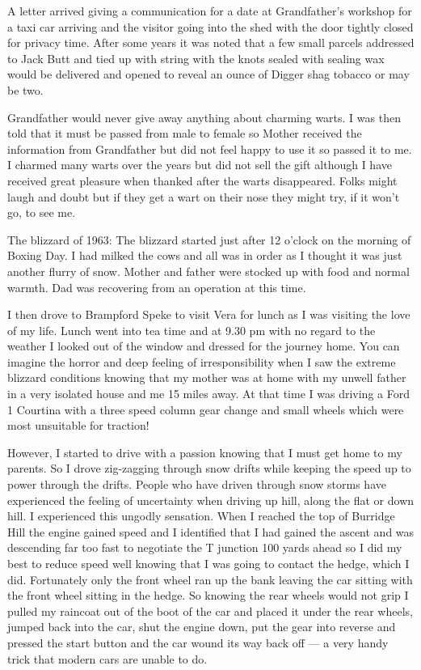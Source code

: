 A letter arrived giving a communication for a date at Grandfather's workshop for
a taxi car arriving and the visitor going into the shed with the door tightly
closed for privacy time. After some years it was noted that a few small
parcels addressed to Jack Butt and tied up with string with the knots sealed
with sealing wax would be delivered and opened to reveal an ounce of Digger
shag tobacco or may be two.

Grandfather would never give away anything about charming warts. I was then
told that it must be passed from male to female so Mother received the
information from Grandfather but did not feel happy to use it so passed it to
me. I charmed many warts over the years but did not sell the gift although I
have received great pleasure when thanked after the warts disappeared. Folks
might laugh and doubt but if they get a wart on their nose they might try, if
it won't go, to see me.









The blizzard of 1963: The blizzard started just after 12 o'clock on the morning
of Boxing Day. I had milked the cows and all was in order as I thought it was
just another flurry of snow. Mother and father were stocked up with food and
normal warmth. Dad was recovering from an operation at this time.

I then drove to Brampford Speke to visit Vera for lunch as I was visiting the
love of my life. Lunch went into tea time and at 9.30 pm with no regard to the
weather I looked out of the window and dressed for the journey home. You can
imagine the horror and deep feeling of irresponsibility when I saw the extreme
blizzard conditions knowing that my mother was at home with my unwell father in
a very isolated house and me 15 miles away. At that time I was driving a Ford
1 Courtina with a three speed column gear change and small wheels which were
most unsuitable for traction!

However, I started to drive with a passion knowing that I must get home to my
parents. So I drove zig-zagging through snow drifts while keeping the speed
up to power through the drifts. People who have driven through snow storms have
experienced the feeling of uncertainty when driving up hill, along the flat or
down hill. I experienced this ungodly sensation. When I reached the top of
Burridge Hill the engine gained speed and I identified that I had gained the
ascent and was descending far too fast to negotiate the T junction 100 yards
ahead so I did my best to reduce speed well knowing that I was going to contact
the hedge, which I did. Fortunately only the front wheel ran up the bank
leaving the car sitting with the front wheel sitting in the hedge. So knowing
the rear wheels would not grip I pulled my raincoat out of the boot of the car
and placed it under the rear wheels, jumped back into the car, shut the engine
down, put the gear into reverse and pressed the start button and the car wound
its way back off --- a very handy trick that modern cars are unable to do.

